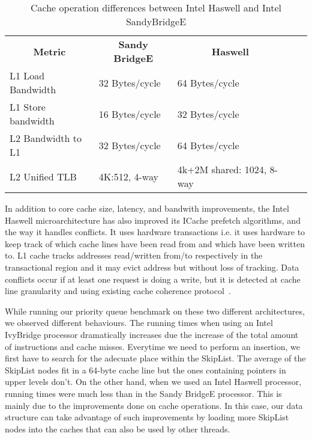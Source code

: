\begin{table}[ht]
\footnotesize
\begin{tabular}{|l|l|l|ll}
\cline{1-3}
\multicolumn{1}{|c|}{\textbf{Metric}} & \multicolumn{1}{c|}{\textbf{Sandy BridgeE}} & \multicolumn{1}{c|}{\textbf{Haswell}} &  &  \\ \cline{1-3}
L1 Load Bandwidth                     & 32 Bytes/cycle                           & 64 Bytes/cycle                        &  &  \\ \cline{1-3}
L1 Store bandwidth                    & 16 Bytes/cycle                           & 32 Bytes/cycle                        &  &  \\ \cline{1-3}
L2 Bandwidth to L1                    & 32 Bytes/cycle                           & 64 Bytes/cycle                        &  &  \\ \cline{1-3}
L2 Unified TLB                        & 4K:512, 4-way                            & 4k+2M shared: 1024, 8-way             &  &  \\ \cline{1-3}
\end{tabular}
\caption{Cache operation differences between Intel Haswell and Intel SandyBridgeE}
\label{tab:haswell_ivy}
\end{table}

In addition to core cache size, latency, and bandwith improvements, the Intel Haswell microarchitecture has also improved its ICache prefetch algorithms, and the way it handles conflicts. It uses hardware transactions i.e. it uses hardware to keep track of which cache lines have been read from and which have been written to. L1 cache tracks addresses read/written from/to respectively in the transactional region and it may evict address but without loss of tracking. Data conflicts occur if at least one request is doing a write, but it is detected at cache line granularity and using existing cache coherence protocol~\cite{rajwar_qconsf2012,dk_haswell}.

While running our priority queue benchmark on these two different architectures, we observed different behaviours. The running times when using an Intel IvyBridge processor dramatically increases due the increase of the total amount of instructions and cache misses. Everytime we need to perform an insertion, we first have to search for the adecuate place within the SkipList. The average of the SkipList nodes fit in a 64-byte cache line but the ones containing pointers in upper levels don't. On the other hand, when we used an Intel Haswell processor, running times were much less than in the Sandy BridgeE processor. This is mainly due to the improvements done on cache operations. In this case, our data structure can take advantage of such improvements by loading more SkipList nodes into the caches that can also be used by other threads.

